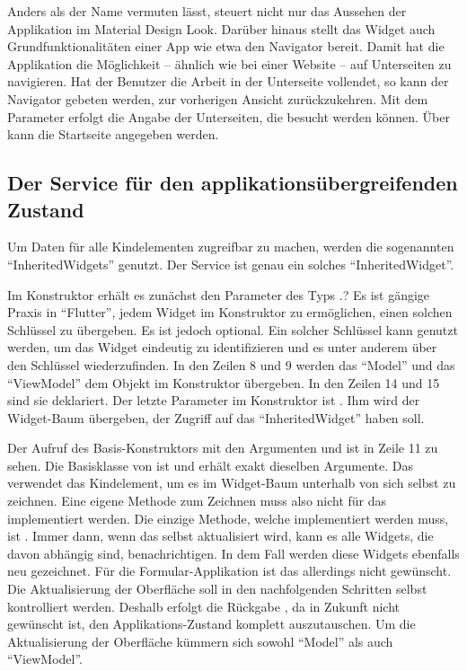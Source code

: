Anders als der Name vermuten lässt, steuert  nicht nur das Aussehen der Applikation im Material Design Look.
Darüber hinaus stellt das Widget auch Grundfunktionalitäten einer App wie etwa den Navigator bereit.
Damit hat die Applikation die Möglichkeit -- ähnlich wie bei einer Website -- auf Unterseiten zu navigieren.
Hat der Benutzer die Arbeit in der Unterseite vollendet, so kann der Navigator gebeten werden, zur vorherigen Ansicht zurückzukehren.
 Mit dem Parameter   erfolgt die Angabe der Unterseiten, die besucht werden können.
Über   kann die Startseite angegeben werden.



\subsection{Der Service für den applikationsübergreifenden Zustand}

Um Daten für alle Kindelementen zugreifbar zu machen, werden die sogenannten \enquote{InheritedWidgets} genutzt.
Der Service  \Lst{\ref{lst:Schritt1DerServiceAppState}} ist genau ein solches \enquote{InheritedWidget}.

Im Konstruktor erhält es zunächst den Parameter des Typs  .?
Es ist gängige Praxis in \enquote{Flutter}, jedem Widget im Konstruktor zu ermöglichen, einen solchen Schlüssel zu übergeben.
Es ist jedoch optional.
 Ein solcher Schlüssel kann genutzt werden, um das Widget eindeutig zu identifizieren und es unter anderem über den Schlüssel wiederzufinden.
In den Zeilen 8 und 9 werden das \enquote{Model} und das \enquote{ViewModel} dem Objekt im Konstruktor übergeben.
In den Zeilen 14 und 15 sind sie deklariert.
Der letzte Parameter im Konstruktor ist .
Ihm wird der Widget-Baum übergeben, der Zugriff auf das \enquote{InheritedWidget} haben soll.

Der Aufruf des Basis-Konstruktors mit den Argumenten  und  ist in Zeile 11 zu sehen.
Die Basisklasse von  ist  und erhält exakt dieselben Argumente.
 Das  verwendet das Kindelement, um es im Widget-Baum unterhalb von sich selbst zu zeichnen.
 Eine eigene Methode zum Zeichnen muss also nicht für das  implementiert werden.
Die einzige Methode, welche implementiert werden muss, ist  .
Immer dann, wenn das  selbst aktualisiert wird, kann es alle Widgets, die davon abhängig sind, benachrichtigen.
 In dem Fall werden diese  Widgets ebenfalls neu gezeichnet.
Für die Formular-Applikation ist das allerdings nicht gewünscht.
Die Aktualisierung der Oberfläche soll in den nachfolgenden Schritten selbst kontrolliert werden.
Deshalb erfolgt die Rückgabe , da in Zukunft nicht gewünscht ist, den Applikations-Zustand komplett auszutauschen.
 Um die  Aktualisierung  der Oberfläche  kümmern sich sowohl \enquote{Model} als auch \enquote{ViewModel}.

